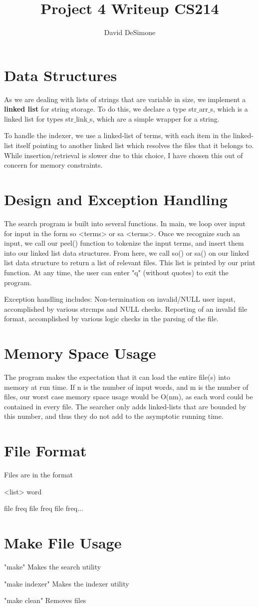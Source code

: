 \documentclass[]{article}
\title{Project 4 Writeup CS214}
\author{David DeSimone}
\begin{document}
\maketitle


\section{Data Structures} 
As we are dealing with lists of strings that are variable in size, we implement a \textbf{linked list} for string storage. To do this, we declare a type str$\_$arr$\_$s, which is a linked list for types str$\_$link$\_$s, which are a simple wrapper for a string. \par

To handle the indexer, we use a linked-list of terms, with each item in the linked-list itself pointing to another linked list which resolves the files that it belongs to. While insertion/retrieval is slower due to this choice, I have chosen this out of concern for memory constraints.  

\section{Design and Exception Handling}
The search program is built into several functions. In main, we loop over input for input in the form so <terms> or sa <terms>. Once we recognize such an input, we call our peel() function to tokenize the input terms, and insert them into our linked list data structures. From here, we call so() or sa() on our linked list data structure to return a list of relevant files. This list is printed by our print function. At any time, the user can enter "q" (without quotes) to exit the program. \par

Exception handling includes: Non-termination on invalid/NULL user input, accomplished by various strcmps and NULL checks. Reporting of an invalid file format, accomplished by various logic checks in the parsing of the file. 

\section{Memory Space Usage}
The program makes the expectation that it can load the entire file(s) into memory at run time. If n is the number of input words, and m is the number of files, our worst case memory space usage would be O(nm), as each word could be contained in every file. The searcher only adds linked-lists that are bounded by this number, and thus they do not add to the asymptotic running time. 

\section{File Format}
Files are in the format \par
<list> word \par
file freq file freq file freq...


\section{Make File Usage}
"make" Makes the search utility \par
"make indexer" Makes the indexer utility \par
"make clean" Removes files  \par
\end{document}
